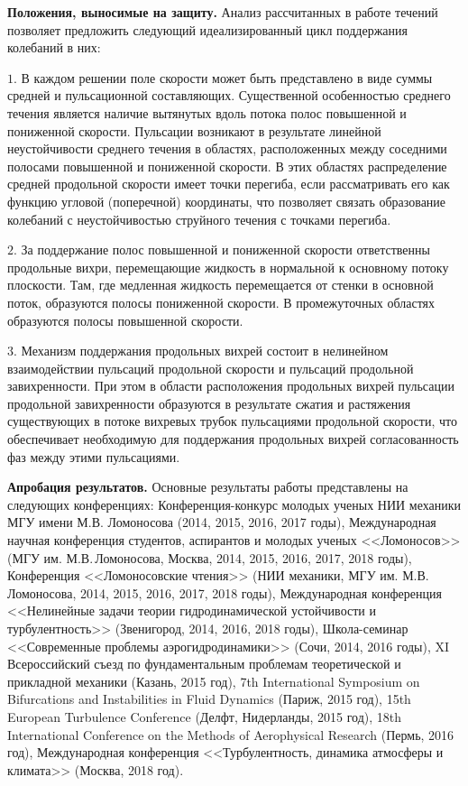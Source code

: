 {\bf Положения, выносимые на защиту.} Анализ рассчитанных в работе течений позволяет предложить следующий идеализированный цикл поддержания колебаний в них:

\noindent $1.$ В каждом решении поле скорости может быть представлено в виде суммы средней и пульсационной составляющих. Существенной особенностью среднего течения является наличие вытянутых вдоль потока полос повышенной и пониженной скорости. Пульсации возникают в результате линейной неустойчивости среднего течения в областях, расположенных между соседними полосами повышенной и пониженной скорости. В этих областях распределение средней продольной скорости имеет точки перегиба, если рассматривать его как функцию угловой (поперечной) координаты, что позволяет связать образование колебаний с неустойчивостью струйного течения с точками перегиба. 

\noindent $2.$ За поддержание полос повышенной и пониженной скорости ответственны продольные вихри, перемещающие жидкость в нормальной к основному потоку плоскости. Там, где медленная жидкость перемещается от стенки в основной поток, образуются полосы пониженной скорости. В промежуточных областях образуются полосы повышенной скорости. 

\noindent $3.$ Механизм поддержания продольных вихрей состоит в нелинейном взаимодействии пульсаций продольной скорости и пульсаций продольной завихренности. При этом в области расположения продольных вихрей пульсации продольной завихренности образуются в результате сжатия и растяжения существующих в потоке вихревых трубок пульсациями продольной скорости, что обеспечивает необходимую для поддержания продольных вихрей согласованность фаз между этими пульсациями. 

{\bf Апробация результатов.} 
Основные результаты работы представлены на следующих конференциях: 
Конференция-конкурс молодых ученых НИИ механики МГУ имени М.В. Ломоносова (2014, 2015, 2016, 2017 годы),
Международная научная конференция студентов, аспирантов и молодых ученых <<Ломоносов>> (МГУ им. М.В.\,Ломоносова, Москва, 2014, 2015, 2016, 2017, 2018 годы), 
Конференция <<Ломоносовские чтения>> (НИИ механики, МГУ им. М.В. Ломоносова, 2014, 2015, 2016, 2017, 2018 годы),
Международная конференция <<Нелинейные задачи теории гидродинамической устойчивости и турбулентность>> (Звенигород, 2014, 2016, 2018 годы),
Школа-семинар <<Современные проблемы аэрогидродинамики>> (Сочи, 2014, 2016 годы),
XI Всероссийский съезд по фундаментальным проблемам теоретической и прикладной механики (Казань, 2015 год),
7th International Symposium on Bifurcations and Instabilities in Fluid Dynamics (Париж, 2015 год),
15th European Turbulence Conference (Делфт, Нидерланды, 2015 год),
18th International Conference on the Methods of Aerophysical Research (Пермь, 2016 год),
Международная конференция <<Турбулентность, динамика атмосферы и климата>> (Москва, 2018 год).

